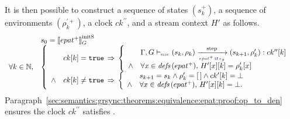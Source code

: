 \begin{skippableproof}
    It is then possible to construct a sequence of states $(s_k^+)$, a sequence of environments
    $(\rho_k^{\prime+})$, a clock $ck^{\prime\prime}$, and a stream context $H'$ as follows.
    \begin{equation*}
        \begin{array}{ll}
                              & s_0 = \initstate{epat^+} \\
            \forall k \in \N, &
            \left\{
            \begin{array}{ll}
                       & ck[k] = \true \, \Rightarrow \,
                \left\{
                \begin{array}{ll}
                           & \epatOpsem{\rho_k}{s_k}{\guarded{epat^+}{e_g}}{s_{k+1}}{ck^{\prime\prime}[k]}{\rho'_k} \\
                    \wedge & \forall x \in \defs{epat^+}, \, H'[x][k] = \rho'_k[x]                                  \\
                \end{array}
                \right.                                     \\
                \wedge & ck[k] \neq \true \, \Rightarrow \,
                \left\{
                \begin{array}{ll}
                           & s_{k+1} = s_k \wedge \rho'_k = \emptyrho \wedge ck'[k] = \bot \\
                    \wedge & \forall x \in \defs{epat^+}, \, H'[x][k] = \bot.              \\
                \end{array}
                \right.                                     \\
            \end{array}
            \right.
        \end{array}
    \end{equation*}
    Paragraph~\ref{sec:semantics:grsync:theorems:equivalence:epat:proof:op_to_den} ensures the clock
    $ck^{\prime\prime}$ satisfies .


\end{skippableproof}
